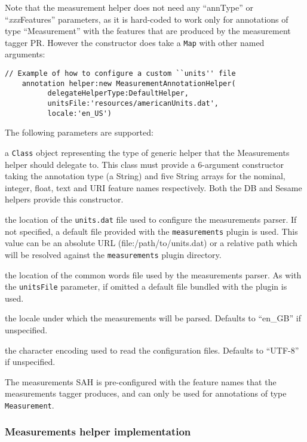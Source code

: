 Note that the measurement helper does not need any ``annType'' or
``{\em xxx}Features'' parameters, as it is hard-coded to work only for
annotations of type ``Measurement'' with the features that are produced by the
measurement tagger PR.  However the constructor does take a {\tt Map} with
other named arguments:
\begin{lstlisting}[firstnumber=6,texcl]
    // Example of how to configure a custom ``units'' file
    annotation helper:new MeasurementAnnotationHelper(
          delegateHelperType:DefaultHelper,
          unitsFile:'resources/americanUnits.dat',
          locale:'en_US')
\end{lstlisting}

The following parameters are supported:
\bde
\item[delegateHelperType (required)] a {\tt Class} object representing the type
  of generic helper that the Measurements helper should delegate to.  This
  class must provide a 6-argument constructor taking the annotation type (a
  String) and five String arrays for the nominal, integer, float, text and URI
  feature names respectively.  Both the DB and Sesame helpers provide this
  constructor.
\item[unitsFile] the location of the {\tt units.dat} file used to configure the
  measurements parser.  If not specified, a default file provided with the
  {\tt measurements} plugin is used.  This value can be an absolute URL
  (file:/path/to/units.dat) or a relative path which will be resolved against
  the {\tt measurements} plugin directory.
\item[commonWords] the location of the common words file used by the
  measurements parser.  As with the {\tt unitsFile} parameter, if omitted a
  default file bundled with the plugin is used.
\item[locale] the locale under which the measurements will be parsed.  Defaults
  to ``en\_GB'' if unspecified.
\item[encoding] the character encoding used to read the configuration files.
  Defaults to ``UTF-8'' if unspecified.
\ede

The measurements SAH is pre-configured with the feature names that the
measurements tagger produces, and can only be used for annotations of type
{\tt Measurement}.

\subsubsection{Measurements helper implementation}

